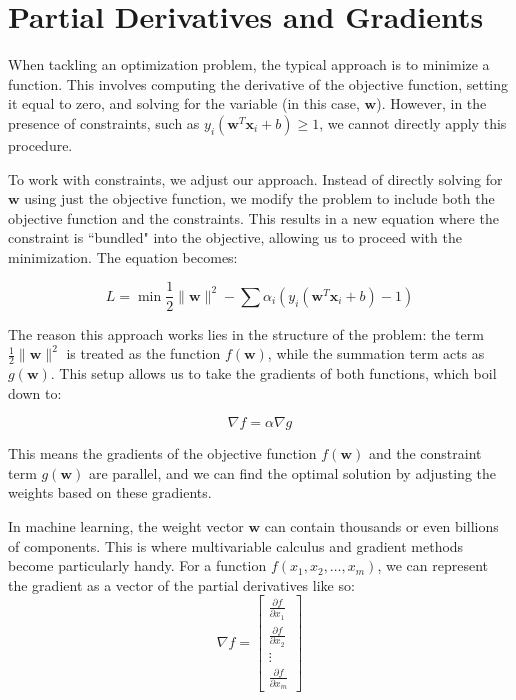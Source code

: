 \section{Partial Derivatives and Gradients}

When tackling an optimization problem, the typical approach is to minimize a function. This involves computing the derivative of the objective function, setting it equal to zero, and solving for the variable (in this case, \( \mathbf{w} \)). However, in the presence of constraints, such as \( y_i (\mathbf{w}^T \mathbf{x}_i + b) \geq 1 \), we cannot directly apply this procedure. 

To work with constraints, we adjust our approach. Instead of directly solving for \( \mathbf{w} \) using just the objective function, we modify the problem to include both the objective function and the constraints. This results in a new equation where the constraint is ``bundled" into the objective, allowing us to proceed with the minimization. 
The equation becomes:

\[
L = \min \frac{1}{2} \| \mathbf{w} \|^2 - \sum \alpha_i \left( y_i (\mathbf{w}^T \mathbf{x}_i + b) - 1 \right)
\]

The reason this approach works lies in the structure of the problem: the term \( \frac{1}{2} \| \mathbf{w} \|^2 \) is treated as the function \( f(\mathbf{w}) \), while the summation term acts as \( g(\mathbf{w}) \). This setup allows us to take the gradients of both functions, which boil down to:

\[
\nabla f = \alpha \nabla g
\]

This means the gradients of the objective function \( f(\mathbf{w}) \) and the constraint term \( g(\mathbf{w}) \) are parallel, and we can find the optimal solution by adjusting the weights based on these gradients.

In machine learning, the weight vector \( \mathbf{w} \) can contain thousands or even billions of components. This is where multivariable calculus and gradient methods become particularly handy. For a function \( f(x_1, x_2, \dots, x_m) \), we can represent the gradient as a vector of the partial derivatives like so:
\[
\nabla f = \begin{bmatrix}
\frac{\partial f}{\partial x_1} \\
\frac{\partial f}{\partial x_2} \\
\vdots \\
\frac{\partial f}{\partial x_m}
\end{bmatrix}
\]

